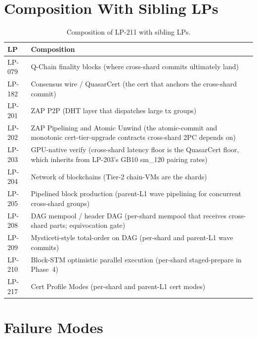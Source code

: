 \section{Composition With Sibling LPs}

\begin{table}[h]
\centering
\small
\begin{tabular}{@{}lp{9cm}@{}}
\toprule
\textbf{LP} & \textbf{Composition} \\
\midrule
LP-079 & Q-Chain finality blocks (where cross-shard commits ultimately land) \\
LP-182 & Consensus wire / QuasarCert (the cert that anchors the cross-shard commit) \\
LP-201 & ZAP P2P (DHT layer that dispatches large tx groups) \\
LP-202 & ZAP Pipelining and Atomic Unwind (the atomic-commit and monotonic cert-tier-upgrade contracts cross-shard 2PC depends on) \\
LP-203 & GPU-native verify (cross-shard latency floor is the QuasarCert floor, which inherits from LP-203's GB10 sm\_120 pairing rates) \\
LP-204 & Network of blockchains (Tier-2 chain-VMs are the shards) \\
LP-205 & Pipelined block production (parent-L1 wave pipelining for concurrent cross-shard groups) \\
LP-208 & DAG mempool / header DAG (per-shard mempool that receives cross-shard parts; equivocation gate) \\
LP-209 & Mysticeti-style total-order on DAG (per-shard and parent-L1 wave commits) \\
LP-210 & Block-STM optimistic parallel execution (per-shard staged-prepare in Phase~4) \\
LP-217 & Cert Profile Modes (per-shard and parent-L1 cert modes) \\
\bottomrule
\end{tabular}
\caption{Composition of LP-211 with sibling LPs.}
\label{tab:composition}
\end{table}

\section{Failure Modes}

